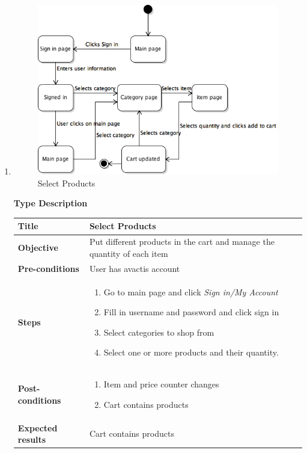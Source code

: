 \documentclass[UKenglish,12pt]{article}
\begin{document}
\begin{enumerate}
\item
\begin{figure}[H]
\centering
\includegraphics[scale=0.7,keepaspectratio]{Images/SelectProducts.png}
\caption{Select Products}
\end{figure}

\textbf{\hspace{0.3cm}Type\hspace{4.4cm} Description}
\newline \vspace{0.2cm}
\begin{tabular}{| p{5cm} | p{10cm} | }
	\hline
	 \textbf{Title} & Select Products \\ \hline
	 \textbf{Objective} & Put different products in the cart and manage the quantity of each item \\ \hline
	 \textbf{Pre-conditions} & User has avactis account \\ \hline
	 \textbf{Steps} & \begin{enumerate} \item Go to main page and click \textit{Sign in/My Account} \item Fill in username and password and click sign in \item Select categories to shop from \item Select one or more products and their quantity.
	 \end{enumerate} \\ \hline
	 \textbf{Post-conditions} & \begin{enumerate} \item Item and price counter changes \item Cart contains products \end{enumerate}  \\ \hline
	 \textbf{Expected results} & Cart contains products \\ 
	 \hline
\end{tabular} %




\end{enumerate}
\end{document}
